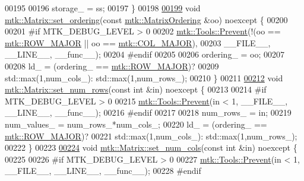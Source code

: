 \begin{DoxyCode}
00195 
00196   storage\_ = ss;
00197 \}
00198 
\hypertarget{mtk__matrix_8cc_source_l00199}{}\hyperlink{classmtk_1_1Matrix_a8bdaf3f8307b00a36843359f165e1f17}{00199} \textcolor{keywordtype}{void} \hyperlink{classmtk_1_1Matrix_a8bdaf3f8307b00a36843359f165e1f17}{mtk::Matrix::set\_ordering}(\textcolor{keyword}{const} 
      \hyperlink{group__c02-enums_ga622801bd9f912d0f976c3e383f5f581c}{mtk::MatrixOrdering} &oo) noexcept \{
00200 
00201 \textcolor{preprocessor}{  #if MTK\_DEBUG\_LEVEL > 0}
00202   \hyperlink{classmtk_1_1Tools_a332324c6f25e66be9dff48c5987a3b9f}{mtk::Tools::Prevent}(!(oo == \hyperlink{namespacemtk_ga622801bd9f912d0f976c3e383f5f581cabc55178ac16eb1ce89b5f3ab915a91f3}{mtk::ROW\_MAJOR} || oo == 
      \hyperlink{namespacemtk_ga622801bd9f912d0f976c3e383f5f581ca7c11989c132253fb76b8f6b1314f7e13}{mtk::COL\_MAJOR}),
00203                       \_\_FILE\_\_, \_\_LINE\_\_, \_\_func\_\_);
00204 \textcolor{preprocessor}{  #endif}
00205 
00206   ordering\_ = oo;
00207 
00208   ld\_ = (ordering\_ == \hyperlink{namespacemtk_ga622801bd9f912d0f976c3e383f5f581cabc55178ac16eb1ce89b5f3ab915a91f3}{mtk::ROW\_MAJOR})?
00209     std::max(1,num\_cols\_): std::max(1,num\_rows\_);
00210 \}
00211 
\hypertarget{mtk__matrix_8cc_source_l00212}{}\hyperlink{classmtk_1_1Matrix_aa4aee0281421c22d9af273b7beb84306}{00212} \textcolor{keywordtype}{void} \hyperlink{classmtk_1_1Matrix_aa4aee0281421c22d9af273b7beb84306}{mtk::Matrix::set\_num\_rows}(\textcolor{keyword}{const} \textcolor{keywordtype}{int} &in) noexcept \{
00213 
00214 \textcolor{preprocessor}{  #if MTK\_DEBUG\_LEVEL > 0}
00215   \hyperlink{classmtk_1_1Tools_a332324c6f25e66be9dff48c5987a3b9f}{mtk::Tools::Prevent}(in < 1, \_\_FILE\_\_, \_\_LINE\_\_, \_\_func\_\_);
00216 \textcolor{preprocessor}{  #endif}
00217 
00218   num\_rows\_ = in;
00219   num\_values\_ = num\_rows\_*num\_cols\_;
00220   ld\_ = (ordering\_ == \hyperlink{namespacemtk_ga622801bd9f912d0f976c3e383f5f581cabc55178ac16eb1ce89b5f3ab915a91f3}{mtk::ROW\_MAJOR})?
00221     std::max(1,num\_cols\_): std::max(1,num\_rows\_);
00222 \}
00223 
\hypertarget{mtk__matrix_8cc_source_l00224}{}\hyperlink{classmtk_1_1Matrix_aad6b4ced4a0447cc7bf2347fe86fd722}{00224} \textcolor{keywordtype}{void} \hyperlink{classmtk_1_1Matrix_aad6b4ced4a0447cc7bf2347fe86fd722}{mtk::Matrix::set\_num\_cols}(\textcolor{keyword}{const} \textcolor{keywordtype}{int} &in) noexcept \{
00225 
00226 \textcolor{preprocessor}{  #if MTK\_DEBUG\_LEVEL > 0}
00227   \hyperlink{classmtk_1_1Tools_a332324c6f25e66be9dff48c5987a3b9f}{mtk::Tools::Prevent}(in < 1, \_\_FILE\_\_, \_\_LINE\_\_, \_\_func\_\_);
00228 \textcolor{preprocessor}{  #endif}

\end{DoxyCode}
